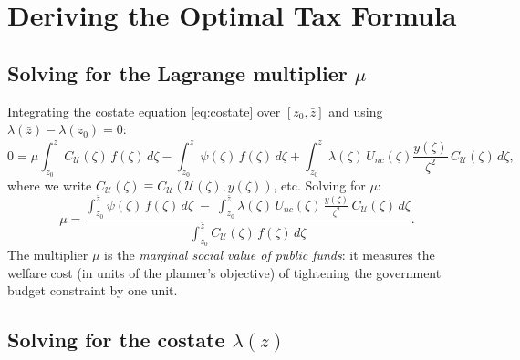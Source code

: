 \documentclass[12pt,a4paper]{article}
\theoremstyle{definition}
\theoremstyle{plain}
\theoremstyle{remark}
\newcommand{\zbar}{\bar{z}}
\newcommand{\zlow}{z_{\scriptscriptstyle 0}}
\newcommand{\calU}{\mathcal{U}}
\begin{document}
\section{Deriving the Optimal Tax Formula}
\label{sec:formula}

\subsection{Solving for the Lagrange multiplier $\mu$}

Integrating the costate equation \eqref{eq:costate} over $[\zlow, \zbar]$ and using $\lambda(\zbar) - \lambda(\zlow) = 0$:
\[
  0 = \mu \!\int_{\zlow}^{\zbar}\! C_{\calU}(\zeta) \, f(\zeta) \, d\zeta
    - \int_{\zlow}^{\zbar}\! \psi(\zeta) \, f(\zeta) \, d\zeta
    + \int_{\zlow}^{\zbar}\! \lambda(\zeta) \, U_{nc}(\zeta) \frac{y(\zeta)}{\zeta^2} \, C_{\calU}(\zeta) \, d\zeta,
\]
where we write $C_{\calU}(\zeta) \equiv C_{\calU}(\calU(\zeta), y(\zeta))$, etc. Solving for $\mu$:
\begin{equation}
\label{eq:mu_general}
  \mu = \frac{
    \displaystyle\int_{\zlow}^{\zbar} \psi(\zeta) \, f(\zeta) \, d\zeta
    \;-\; \int_{\zlow}^{\zbar} \lambda(\zeta) \, U_{nc}(\zeta) \, \frac{y(\zeta)}{\zeta^2} \, C_{\calU}(\zeta) \, d\zeta
  }{
    \displaystyle\int_{\zlow}^{\zbar} C_{\calU}(\zeta) \, f(\zeta) \, d\zeta
  }.
\end{equation}
The multiplier $\mu$ is the \emph{marginal social value of public funds}: it measures the welfare cost (in units of the planner's objective) of tightening the government budget constraint by one unit.

\subsection{Solving for the costate $\lambda(z)$}
\end{document}
